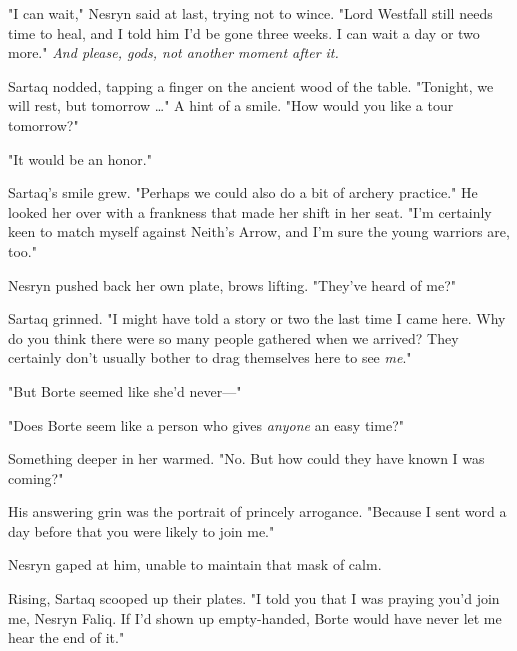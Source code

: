"I can wait," Nesryn said at last, trying not to wince. "Lord Westfall still needs time to heal, and I told him I'd be gone three weeks. I can wait a day or two more." \emph{And please, gods, not another moment after it.}

Sartaq nodded, tapping a finger on the ancient wood of the table. "Tonight, we will rest, but tomorrow \ldots" A hint of a smile. "How would you like a tour tomorrow?"

"It would be an honor."

Sartaq's smile grew. "Perhaps we could also do a bit of archery practice." He looked her over with a frankness that made her shift in her seat. "I'm certainly keen to match myself against Neith's Arrow, and I'm sure the young warriors are, too."

Nesryn pushed back her own plate, brows lifting. "They've heard of me?"

Sartaq grinned. "I might have told a story or two the last time I came here. Why do you think there were so many people gathered when we arrived? They certainly don't usually bother to drag themselves here to see \emph{me}."

"But Borte seemed like she'd never---"

"Does Borte seem like a person who gives \emph{anyone} an easy time?"

Something deeper in her warmed. "No. But how could they have known I was coming?"

His answering grin was the portrait of princely arrogance. "Because I sent word a day before that you were likely to join me."

Nesryn gaped at him, unable to maintain that mask of calm.

Rising, Sartaq scooped up their plates. "I told you that I was praying you'd join me, Nesryn Faliq. If I'd shown up empty-handed, Borte would have never let me hear the end of it."

